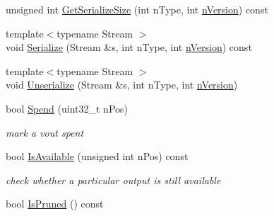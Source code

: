 \begin{DoxyCompactItemize}
\item 
unsigned int \hyperlink{class_c_coins_a74ddd9230570c084ea56feaf4b9d7e06}{Get\+Serialize\+Size} (int n\+Type, int \hyperlink{class_c_coins_a96fea4ee8841e9ce32f60c2e7e3cf6b6}{n\+Version}) const 
\item 
{\footnotesize template$<$typename Stream $>$ }\\void \hyperlink{class_c_coins_a0932a94966083092cbceabec1ef65d73}{Serialize} (Stream \&s, int n\+Type, int \hyperlink{class_c_coins_a96fea4ee8841e9ce32f60c2e7e3cf6b6}{n\+Version}) const 
\item 
{\footnotesize template$<$typename Stream $>$ }\\void \hyperlink{class_c_coins_adaa98cb6d8da3a4d573cd799ddd11051}{Unserialize} (Stream \&s, int n\+Type, int \hyperlink{class_c_coins_a96fea4ee8841e9ce32f60c2e7e3cf6b6}{n\+Version})
\item 
bool \hyperlink{class_c_coins_a0acc5f3849c1c41386d9450a3ee3a3c8}{Spend} (uint32\+\_\+t n\+Pos)
\begin{DoxyCompactList}\small\item\em mark a vout spent \end{DoxyCompactList}\item 
bool \hyperlink{class_c_coins_a69bdcbac02e1644cb02b2645068777b5}{Is\+Available} (unsigned int n\+Pos) const 
\begin{DoxyCompactList}\small\item\em check whether a particular output is still available \end{DoxyCompactList}\item 
bool \hyperlink{class_c_coins_af28a2e44f0b41c3a4a6366607b4b8f81}{Is\+Pruned} () const 
\end{DoxyCompactItemize}
